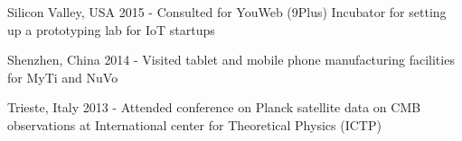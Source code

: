% 


\begin{cvskills}

  \cvskill
    {Silicon Valley, USA} %
    {2015 - Consulted for YouWeb (9Plus) Incubator for setting up a prototyping lab for IoT startups} %

  \cvskill
    {Shenzhen, China} %
    {2014 - Visited tablet and mobile phone manufacturing facilities for MyTi and NuVo} %

  \cvskill
    {Trieste, Italy} %
    {2013 - Attended conference on Planck satellite data on CMB observations at International center for Theoretical Physics (ICTP) } %

\end{cvskills}
% 
% 

